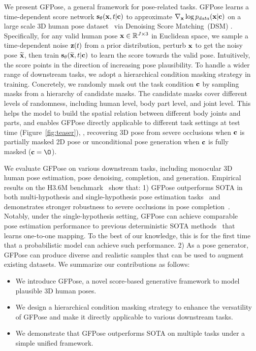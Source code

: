 \documentclass[10pt,twocolumn,letterpaper]{article}
\begin{document}
We present GFPose, a general framework for pose-related tasks. GFPose learns a time-dependent score network $\mathbf{s}_{\theta}(\mathbf{x}, t|\mathbf{c})$ to approximate $\nabla_{\mathbf{x}}\log p_{data}(\mathbf{x} | \mathbf{c} )$ on a large scale 3D human pose dataset~\cite{h36m_pami} via Denoising Score Matching~(DSM) \cite{denosingScoreMatching, hyvarinen2005estimation, song2020sliced, song2019generative, song2020improved, song2020score, song2021maximum}. 
Specifically, for any valid human pose $\mathbf{x} \in \mathbb{R}^{J \times 3}$ in Euclidean space, we sample a time-dependent noise $\mathbf{z}(t)$ from a prior distribution, perturb $\mathbf{x}$ to get the noisy pose $\mathbf{\widetilde {x}}$, then train $\mathbf{s}_{\theta}(\mathbf{\widetilde {x}}, t|\mathbf{c})$ to learn the score towards the valid pose. Intuitively, the score points in the direction of increasing pose plausibility. 
To handle a wider range of downstream tasks, we adopt a hierarchical condition masking strategy in training. Concretely, we randomly mask out the task condition $\mathbf{c}$ by sampling masks from a hierarchy of candidate masks. The candidate masks cover different levels of randomness, including human level, body part level, and joint level. This helps the model to build the spatial relation between different body joints and parts, and enables GFPose directly applicable to different task settings at test time (Figure~\ref{fig:teaser}), \eg, recovering 3D pose from severe occlusions when $\mathbf{c}$ is partially masked 2D pose or unconditional pose generation when $\mathbf{c}$ is fully masked ($\cond = \O $).













We evaluate GFPose on various downstream tasks, including monocular 3D human pose estimation, pose denoising, completion, and generation. Empirical results on the H3.6M benchmark~\cite{h36m_pami} show that: 
1) GFPose outperforms SOTA in both multi-hypothesis and single-hypothesis pose estimation tasks~\cite{wehrbein2021probabilistic} and demonstrates stronger robustness to severe occlusions in pose completion~\cite{Li_2019_CVPR}. Notably, under the single-hypothesis setting, GFPose can achieve comparable pose estimation performance to previous deterministic SOTA methods~\cite{zeng2020srnet, ci2019optimizing, pavllo20193d} that learns one-to-one mapping. To the best of our knowledge, this is for the first time that a probabilistic model can achieve such performance. 2) As a pose generator, GFPose can produce diverse and realistic samples that can be used to augment existing datasets.
We summarize our contributions as follows:
\begin{itemize}
    \setlength\itemsep{-0.25em}
\item We introduce GFPose, a novel score-based generative framework to model plausible 3D human poses.
    \item We design a hierarchical condition masking strategy to enhance the versatility of GFPose and make it directly applicable to various downstream tasks.
\item We demonstrate that GFPose outperforms SOTA on multiple tasks under a simple unified framework.
\end{itemize}
\end{document}
